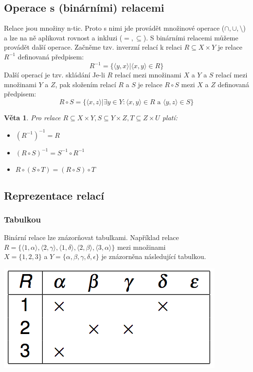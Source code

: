 \documentclass[12pt,a4paper]{article}
\newtheorem{sentence}{Věta}
\begin{document}
\subsection{Operace s (binárními) relacemi}
Relace jsou množiny n-tic. Proto s nimi jde provádět množinové operace ($\cap,\cup,\setminus$) a lze na ně aplikovat rovnost a inkluzi ($=, \subseteq$).
S binárními relacemi můžeme provádět další operace. Začněme tzv. inverzní relací k relaci $R \subseteq X \times Y$ je relace $R^{-1}$ definovaná předpisem: $$R^{-1} = \{\langle y, x \rangle | \langle x, y \rangle \in R\}$$
Další operací je tzv. skládání Je-li $R$ relací mezi množinami $X$ a $Y$ a $S$ relací mezi množinami $Y$ a $Z$, pak složením relací $R$ a $S$ je relace \( R \circ S \) mezi $X$ a $Z$ definovaná předpisem: $$R \circ S = \{\langle x, z \rangle | \exists y \in Y : \langle x,y\rangle \in R \text{ a } \langle y,z \rangle \in S\}$$

\begin{sentence}
	Pro relace $R \subseteq X \times Y, S \subseteq Y \times Z, T \subseteq Z \times U$ platí:
	\begin{itemize}
		\item[a)] $(R^{-1})^{-1} = R$
		\item[b)] $(R \circ S)^{-1} = S^{-1} \circ R^{-1}$
		\item[c)] $R \circ (S \circ T) = (R \circ S) \circ T$
	\end{itemize}
\end{sentence}

\subsection{Reprezentace relací}

\subsubsection{Tabulkou}
Binární relace lze znázorňovat tabulkami. Například relace \\$R = \{ \langle 1, \alpha \rangle, \langle 2, \gamma \rangle, \langle 1, \delta \rangle, \langle 2, \beta \rangle, \langle 3, \alpha \rangle\}$ mezi množinami \\$X = \{1,2,3\}$ a $Y = \{\alpha, \beta, \gamma, \delta, \epsilon\}$ je znázorněna následující tabulkou.

\begin{center}
	\includegraphics[scale=0.5]{img/RelationTable}
\end{center}
\end{document}
